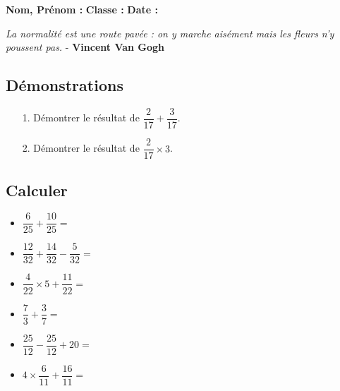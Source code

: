 



\textbf{Nom, Prénom :} \hspace{8cm} \textbf{Classe :} \hspace{3cm} \textbf{Date :}\\
\vspace{-0.8cm}
\begin{center}
  \textit{La normalité est une route pavée : on y marche aisément mais les fleurs n’y poussent pas.} - \textbf{Vincent Van Gogh}
\end{center}
\vspace{-0.8cm}

\subsection*{Démonstrations}

\begin{multicols}{2}
\begin{enumerate}
  \item[1.] Démontrer le résultat de $\dfrac{2}{17} + \dfrac{3}{17}$.  \\ \Pointilles[6] \columnbreak 
  \item[2.] Démontrer le résultat de $\dfrac{2}{17} \times 3$.  \\ \Pointilles[6]
\end{enumerate} 
\end{multicols}

\subsection*{Calculer}

\begin{itemize}[label={$\bullet$}]
\item $\dfrac{6}{25} + \dfrac{10}{25} =$ \dotfill \\
\item $\dfrac{12}{32} + \dfrac{14}{32} - \dfrac{5}{32} =$ \dotfill \\
\item $\dfrac{4}{22} \times 5 + \dfrac{11}{22} =$ \dotfill \\
\item $\dfrac{7}{3} + \dfrac{3}{7} =$ \dotfill \\
\item $\dfrac{25}{12} - \dfrac{25}{12} + 20 =$ \dotfill \\
\item $4 \times \dfrac{6}{11} + \dfrac{16}{11} =$ \dotfill \\
\end{itemize} 


